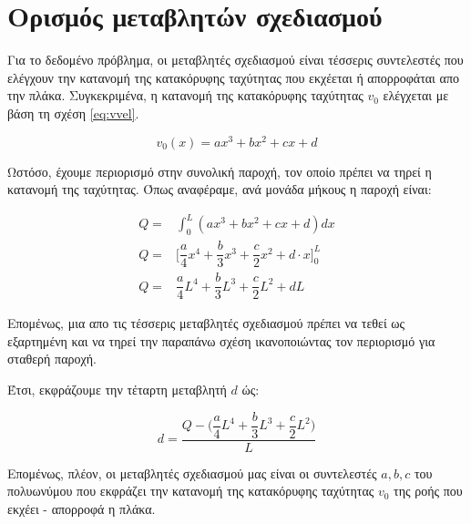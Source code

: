 \section{Ορισμός μεταβλητών σχεδιασμού}

Για το δεδομένο πρόβλημα, οι μεταβλητές σχεδιασμού είναι τέσσερις συντελεστές που ελέγχουν την κατανομή της κατακόρυφης ταχύτητας που εκχέεται ή απορροφάται απο την πλάκα. Συγκεκριμένα, η κατανομή της κατακόρυφης ταχύτητας $v_0$ ελέγχεται με βάση τη σχέση \ref{eq:vvel}.

\begin{equation}
v_0(x) = ax^3 + b x^2 + cx + d
\label{eq:vvel}
\end{equation}

\vspace{10pt}

Ωστόσο, έχουμε περιορισμό στην συνολική παροχή, τον οποίο πρέπει να τηρεί η κατανομή της ταχύτητας. Όπως αναφέραμε, ανά μονάδα μήκους η παροχή είναι:

\begin{equation}
    \begin{aligned}
        Q =& \int_0^L(ax^3+bx^2+cx+d)dx\\[8pt]
        Q =& \Big[\dfrac{a}{4}x^4 + \dfrac{b}{3}x^3 + \dfrac{c}{2}x^2 + d\cdot x\Big]^L_0\\[8pt]
        Q =& \dfrac{a}{4}L^4 + \dfrac{b}{3}L^3 + \dfrac{c}{2}L^2 + dL
    \end{aligned}
    \label{eq:paroxi}
\end{equation}

 \vspace{10pt}

 Επομένως, μια απο τις τέσσερις μεταβλητές σχεδιασμού πρέπει να τεθεί ως εξαρτημένη και να τηρεί την παραπάνω σχέση ικανοποιώντας τον περιορισμό για σταθερή παροχή. 

 Έτσι, εκφράζουμε την τέταρτη μεταβλητή $d$ ώς:

 \begin{equation}
 d = \dfrac{Q - \big(\dfrac{a}{4}L^4 + \dfrac{b}{3}L^3 + \dfrac{c}{2}L^2 \big)}{L} 
    \label{eq:deltaFin}
 \end{equation}

 \vspace{10pt}

 Επομένως, πλέον, οι μεταβλητές σχεδιασμού μας είναι οι συντελεστές $a,b,c$ του πολυωνύμου που εκφράζει την κατανομή της κατακόρυφης ταχύτητας $v_0$ της ροής που εκχέει - απορροφά η πλάκα.
